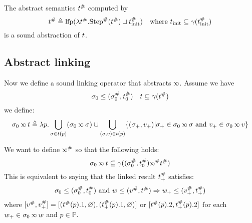 \documentclass{article}
\begin{document}
The abstract semantics ${t}^{\#}$ computed by
\[{t}^{\#}\triangleq\text{lfp}(\lambda{t}^{\#}.{\text{Step}}^{\#}({t}^{\#})\sqcup{t}^{\#}_{\text{init}})\quad\text{where }t_{\text{init}}\subseteq\gamma({t}^{\#}_{\text{init}})\]
is a sound abstraction of $t$.

\subsection{Abstract linking}
Now we define a sound linking operator that abstracts $\semlink$.
Assume we have
\[\sigma_0\le({\sigma}^{\#}_0,{t}^{\#}_0)\quad t\subseteq\gamma({t}^{\#})\]
we define:
\[\ctx_0\semlink\ptree\triangleq\lambda p.\bigcup_{\ctx\in t(p)}(\ctx_0\semlink\ctx)\cup\bigcup_{(\ctx,v)\in t(p)}\{(\ctx_+,v_+)|\ctx_+\in\ctx_0\semlink\ctx\text{ and }v_+\in\ctx_0\semlink v\}\]

We want to define $\Abs\semlink$ so that the following holds:
\[\ctx_0\semlink\ptree\subseteq\gamma((\Abs{\ctx}_0,\Abs{\ptree}_0)\Abs\semlink\Abs\ptree)\]
This is equivalent to saying that the linked result ${t}^{\#}_+$ satisfies:
\[\sigma_0\le({\sigma}^{\#}_0,{t}^{\#}_0)\text{ and }w\le({v}^{\#},{t}^{\#})\Rightarrow w_+\le({v}^{\#}_+,{t}^{\#}_+)\]
where $[{v}^{\#},{v}^{\#}_+] = [({t}^{\#}(p).1,\varnothing),({t}^{\#}_+(p).1,\varnothing)]$ or $[{t}^{\#}(p).2,{t}^{\#}_+(p).2]$
for each $w_+\in\ctx_0\semlink w$ and $p\in\mathbb{P}$.
\end{document}
